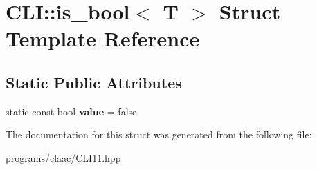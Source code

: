 \hypertarget{struct_c_l_i_1_1is__bool}{}\section{C\+LI\+:\+:is\+\_\+bool$<$ T $>$ Struct Template Reference}
\label{struct_c_l_i_1_1is__bool}
\subsection*{Static Public Attributes}
\begin{DoxyCompactItemize}
\item 
\mbox{\label{struct_c_l_i_1_1is__bool_af31a1a454bf15231195d1a65c093f2f2}} 
static const bool {\bfseries value} = false
\end{DoxyCompactItemize}


The documentation for this struct was generated from the following file\+:\begin{DoxyCompactItemize}
\item 
programs/claac/C\+L\+I11.\+hpp\end{DoxyCompactItemize}
